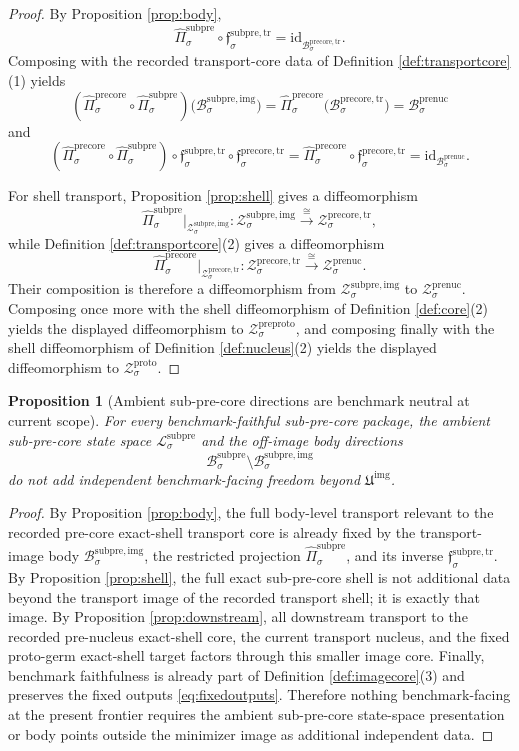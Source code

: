 \documentclass[11pt]{article}
\newcommand{\ProtoShellSet}[1]{\mathcal Z_{#1}^{\mathrm{proto}}}
\newcommand{\PreProtoShellSet}[1]{\mathcal Z_{#1}^{\mathrm{preproto}}}
\newcommand{\PreNucBody}[1]{\mathcal B_{#1}^{\mathrm{prenuc}}}
\newcommand{\PreNucShellSet}[1]{\mathcal Z_{#1}^{\mathrm{prenuc}}}
\newcommand{\PreCoreTrBody}[1]{\mathcal B_{#1}^{\mathrm{precore,tr}}}
\newcommand{\PreCoreTrProj}[1]{\widehat{\Pi}_{#1}^{\mathrm{precore}}}
\newcommand{\PreCoreTrLift}[1]{\mathfrak f_{#1}^{\mathrm{precore,tr}}}
\newcommand{\PreCoreTrShell}[1]{\mathcal Z_{#1}^{\mathrm{precore,tr}}}
\newcommand{\SubPreCoreSpace}[1]{\mathcal L_{#1}^{\mathrm{subpre}}}
\newcommand{\SubPreCoreBody}[1]{\mathcal B_{#1}^{\mathrm{subpre}}}
\newcommand{\SubPreCoreTransportMin}[1]{\mathfrak f_{#1}^{\mathrm{subpre,tr}}}
\newcommand{\SubPreImageCore}{\mathfrak U^{\mathrm{img}}}
\newcommand{\SubPreImgBody}[1]{\mathcal B_{#1}^{\mathrm{subpre,img}}}
\newcommand{\SubPreImgProj}[1]{\widehat{\Pi}_{#1}^{\mathrm{subpre}}}
\newcommand{\SubPreImgShell}[1]{\mathcal Z_{#1}^{\mathrm{subpre,img}}}
\newtheorem{proposition}{Proposition}
\begin{document}
\begin{proof}
By Proposition \ref{prop:body},
\[
\SubPreImgProj{\sigma}\circ\SubPreCoreTransportMin{\sigma}
=
\mathrm{id}_{\PreCoreTrBody{\sigma}}.
\]
Composing with the recorded transport-core data of Definition \ref{def:transportcore}(1) yields
\[
(\PreCoreTrProj{\sigma}\circ\SubPreImgProj{\sigma})\bigl(\SubPreImgBody{\sigma}\bigr)
=
\PreCoreTrProj{\sigma}\bigl(\PreCoreTrBody{\sigma}\bigr)
=
\PreNucBody{\sigma}
\]
and
\[
(\PreCoreTrProj{\sigma}\circ\SubPreImgProj{\sigma})\circ
\SubPreCoreTransportMin{\sigma}\circ\PreCoreTrLift{\sigma}
=
\PreCoreTrProj{\sigma}\circ\PreCoreTrLift{\sigma}
=
\mathrm{id}_{\PreNucBody{\sigma}}.
\]

For shell transport, Proposition \ref{prop:shell} gives a diffeomorphism
\[
\SubPreImgProj{\sigma}\big|_{\SubPreImgShell{\sigma}}
:
\SubPreImgShell{\sigma}\xrightarrow{\cong}\PreCoreTrShell{\sigma},
\]
while Definition \ref{def:transportcore}(2) gives a diffeomorphism
\[
\PreCoreTrProj{\sigma}\big|_{\PreCoreTrShell{\sigma}}
:
\PreCoreTrShell{\sigma}\xrightarrow{\cong}\PreNucShellSet{\sigma}.
\]
Their composition is therefore a diffeomorphism from \(\SubPreImgShell{\sigma}\) to \(\PreNucShellSet{\sigma}\). Composing once more with the shell diffeomorphism of Definition \ref{def:core}(2) yields the displayed diffeomorphism to \(\PreProtoShellSet{\sigma}\), and composing finally with the shell diffeomorphism of Definition \ref{def:nucleus}(2) yields the displayed diffeomorphism to \(\ProtoShellSet{\sigma}\).
\end{proof}

\begin{proposition}[Ambient sub-pre-core directions are benchmark neutral at current scope]
\label{prop:neutral}
For every benchmark-faithful sub-pre-core package, the ambient sub-pre-core state space \(\SubPreCoreSpace{\sigma}\) and the off-image body directions
\[
\SubPreCoreBody{\sigma}\setminus\SubPreImgBody{\sigma}
\]
do not add independent benchmark-facing freedom beyond \(\SubPreImageCore\).
\end{proposition}

\begin{proof}
By Proposition \ref{prop:body}, the full body-level transport relevant to the recorded pre-core exact-shell transport core is already fixed by the transport-image body \(\SubPreImgBody{\sigma}\), the restricted projection \(\SubPreImgProj{\sigma}\), and its inverse \(\SubPreCoreTransportMin{\sigma}\). By Proposition \ref{prop:shell}, the full exact sub-pre-core shell is not additional data beyond the transport image of the recorded transport shell; it is exactly that image. By Proposition \ref{prop:downstream}, all downstream transport to the recorded pre-nucleus exact-shell core, the current transport nucleus, and the fixed proto-germ exact-shell target factors through this smaller image core. Finally, benchmark faithfulness is already part of Definition \ref{def:imagecore}(3) and preserves the fixed outputs \eqref{eq:fixedoutputs}. Therefore nothing benchmark-facing at the present frontier requires the ambient sub-pre-core state-space presentation or body points outside the minimizer image as additional independent data.
\end{proof}
\end{document}
